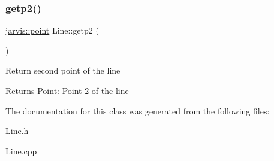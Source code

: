 \subsubsection{\texorpdfstring{getp2()}{getp2()}}
{\footnotesize\ttfamily \hyperlink{structjarvis_1_1point}{jarvis\+::point} Line\+::getp2 (\begin{DoxyParamCaption}{ }\end{DoxyParamCaption})}

Return second point of the line

\begin{DoxyReturn}{Returns}
Point\+: Point 2 of the line 
\end{DoxyReturn}


The documentation for this class was generated from the following files\+:\begin{DoxyCompactItemize}
\item 
Line.\+h\item 
Line.\+cpp\end{DoxyCompactItemize}
